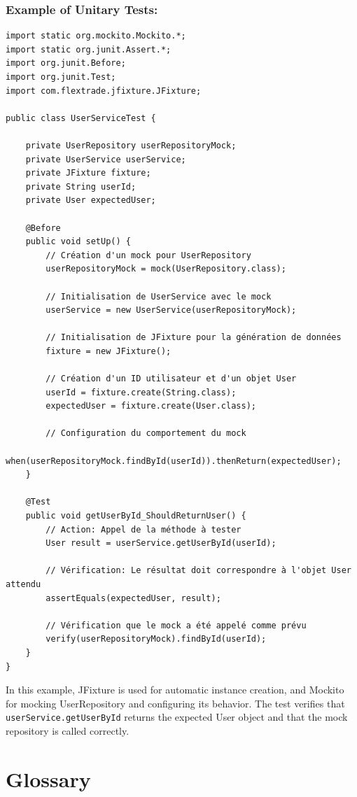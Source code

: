 \documentclass{article}
\begin{document}
\subsubsection*{Example of Unitary Tests:}
\begin{verbatim}
import static org.mockito.Mockito.*;
import static org.junit.Assert.*;
import org.junit.Before;
import org.junit.Test;
import com.flextrade.jfixture.JFixture;

public class UserServiceTest {

    private UserRepository userRepositoryMock;
    private UserService userService;
    private JFixture fixture;
    private String userId;
    private User expectedUser;

    @Before
    public void setUp() {
        // Création d'un mock pour UserRepository
        userRepositoryMock = mock(UserRepository.class);
        
        // Initialisation de UserService avec le mock
        userService = new UserService(userRepositoryMock);

        // Initialisation de JFixture pour la génération de données
        fixture = new JFixture();
        
        // Création d'un ID utilisateur et d'un objet User
        userId = fixture.create(String.class);
        expectedUser = fixture.create(User.class);
        
        // Configuration du comportement du mock
        when(userRepositoryMock.findById(userId)).thenReturn(expectedUser);
    }

    @Test
    public void getUserById_ShouldReturnUser() {
        // Action: Appel de la méthode à tester
        User result = userService.getUserById(userId);

        // Vérification: Le résultat doit correspondre à l'objet User attendu
        assertEquals(expectedUser, result);

        // Vérification que le mock a été appelé comme prévu
        verify(userRepositoryMock).findById(userId);
    }
}
\end{verbatim}

In this example, JFixture is used for automatic instance creation, and Mockito for mocking UserRepository and configuring its behavior. The test verifies that \texttt{userService.getUserById} returns the expected User object and that the mock repository is called correctly.


\section{Glossary}
\end{document}
